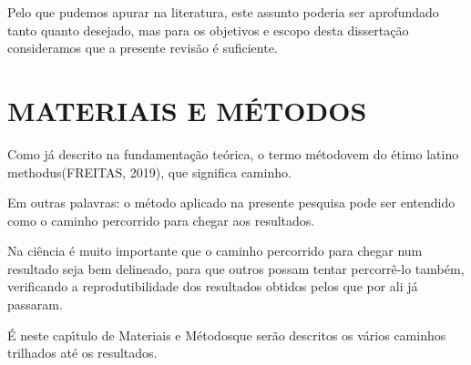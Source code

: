 \documentclass[
12pt,		%
openright,	%
twoside,  %
a4paper,			%
chapter=TITLE,		%
english,			%
french,				%
spanish,			%
brazil				%
]{USPSC-classe/USPSC}
\begin{document}
Pelo que pudemos apurar na literatura, este assunto poderia ser aprofundado tanto quanto desejado, mas para os objetivos e escopo desta disserta\c{c}\~ao consideramos que a presente revis\~ao \'e suficiente.














\chapter[MATERIAIS E M\'ETODOS]{MATERIAIS E M\'ETODOS}\label{MATERIAIS E M\'ETODOS}
Como j\'a descrito na fundamenta\c{c}\~ao te\'orica, o termo \textquotedbl m\'etodo\textquotedbl  vem do \'etimo latino \textquotedbl methodus\textquotedbl   (FREITAS, 2019), que significa \textquotedbl caminho\textquotedbl .














Em outras palavras: o m\'etodo aplicado na presente pesquisa pode ser entendido como o caminho percorrido para chegar aos resultados.














Na ci\^encia \'e muito importante que o caminho percorrido para chegar num resultado seja bem delineado, para que outros possam tentar percorr\^e-lo tamb\'em, verificando a reprodutibilidade dos resultados obtidos pelos que por ali j\'a passaram.














\'E neste cap\'{\i}tulo de \textquotedbl Materiais e M\'etodos\textquotedbl  que ser\~ao descritos os v\'arios caminhos trilhados at\'e os resultados.
\end{document}
